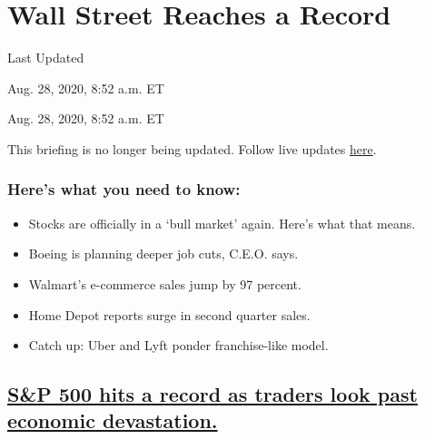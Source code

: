 \hypertarget{wall-street-reaches-a-record}{%
\section{Wall Street Reaches a
Record}\label{wall-street-reaches-a-record}}

Last Updated

Aug. 28, 2020, 8:52 a.m. ET

Aug. 28, 2020, 8:52 a.m. ET

This briefing is no longer being updated. Follow live updates
\href{https://www.nytimes3xbfgragh.onion/2020/08/18/world/coronavirus-covid.html}{here}.

\hypertarget{heres-what-you-need-to-know}{%
\subsubsection{Here's what you need to
know:}\label{heres-what-you-need-to-know}}

\begin{itemize}
\item
  \protect\hyperlink{stocks-are-officially-in-a-bull-market-again-heres-what-that-means}{}

  Stocks are officially in a `bull market' again. Here's what that
  means.
\item
  \protect\hyperlink{boeing-is-planning-deeper-job-cuts-ceo-says}{}

  Boeing is planning deeper job cuts, C.E.O. says.
\item
  \protect\hyperlink{walmarts-e-commerce-sales-jump-by-97-percent}{}

  Walmart's e-commerce sales jump by 97 percent.
\item
  \protect\hyperlink{home-depot-reports-surge-in-second-quarter-sales}{}

  Home Depot reports surge in second quarter sales.
\item
  \protect\hyperlink{catch-up-uber-and-lyft-ponder-franchise-like-model}{}

  Catch up: Uber and Lyft ponder franchise-like model.
\end{itemize}

\hypertarget{sp-500-hits-a-record-as-traders-look-past-economic-devastation}{%
\subsection{\texorpdfstring{\protect\hyperlink{sp-500-hits-a-record-as-traders-look-past-economic-devastation}{S\&P
500 hits a record as traders look past economic
devastation.}}{S\&P 500 hits a record as traders look past economic devastation.}}\label{sp-500-hits-a-record-as-traders-look-past-economic-devastation}}

